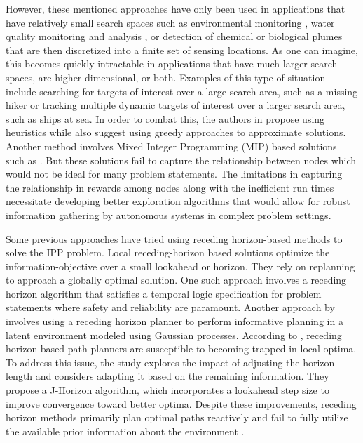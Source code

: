 However, these mentioned approaches have only been used in applications that have relatively small search spaces such as environmental monitoring \cite{lorenzo_orienteering}, water quality monitoring and analysis \cite{water-1}, or detection of chemical or biological plumes \cite{1703649} that are then discretized into a finite set of sensing locations. As one can imagine, this becomes quickly intractable in applications that have much larger search spaces, are higher dimensional, or both. Examples of this type of situation include searching for targets of interest over a large search area, such as a missing hiker or tracking multiple dynamic targets of interest over a larger search area, such as ships at sea.  In order to combat this, the authors in \cite{lorenzo_orienteering} propose using heuristics while \cite{lorenzo_orienteering, efficient_informative, recursive_greedy} also suggest using greedy approaches to approximate solutions. Another method involves Mixed Integer Programming (MIP) based solutions such as \cite{mip_forumation}. But these solutions fail to capture the relationship between nodes which would not be ideal for many problem statements. The limitations in capturing the relationship in rewards among nodes along with the inefficient run times necessitate developing better exploration algorithms that would allow for robust information gathering by autonomous systems in complex problem settings. 

Some previous approaches have tried using receding horizon-based methods to solve the IPP problem. Local receding-horizon based solutions optimize the information-objective over a small lookahead or horizon. They rely on replanning to approach a globally optimal solution. One such approach involves a receding horizon algorithm \cite{receding} that satisfies a temporal logic specification for problem statements where safety and reliability are paramount. Another approach by \cite{no-regret} involves using a receding horizon planner to perform informative planning in a latent environment modeled using Gaussian processes. According to \cite{experimental_receeding_horizon}, receding horizon-based path planners are susceptible to becoming trapped in local optima. To address this issue, the study explores the impact of adjusting the horizon length and considers adapting it based on the remaining information. They propose a J-Horizon algorithm, which incorporates a lookahead step size to improve convergence toward better optima. Despite these improvements, receding horizon methods primarily plan optimal paths reactively and fail to fully utilize the available prior information about the environment \cite{Kailas-2023-137637}.


